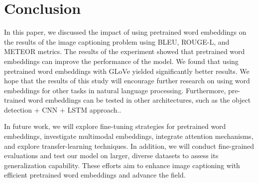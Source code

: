 \documentclass[conference]{IEEEtran}
\begin{document}



\section{Conclusion\label{conclusion}}
In this paper, we discussed the impact of using pretrained word embeddings on the results of the image captioning problem using BLEU, ROUGE-L, and METEOR metrics. The results of the experiment showed that pretrained word embeddings can improve the performance of the model. We found that using pretrained word embeddings with GLoVe yielded significantly better results. We hope that the results of this study will encourage further research on using word embeddings for other tasks in natural language processing. Furthermore, pre-trained word embeddings can be tested in other architectures, such as the object detection + CNN + LSTM approach.\cite{DBLP:journals/corr/YangZRH17}.

In future work, we will explore fine-tuning strategies for pretrained word embeddings, investigate multimodal embeddings, integrate attention mechanisms, and explore transfer-learning techniques. In addition, we will conduct fine-grained evaluations and test our model on larger, diverse datasets to assess its generalization capability. These efforts aim to enhance image captioning with efficient pretrained word embeddings and advance the field.


\renewcommand{\refname}{References}


\end{document}
